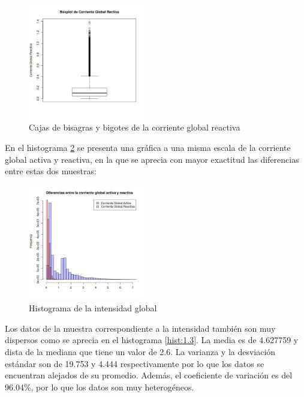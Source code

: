 \documentclass[a4paper,10pt,twocolumn]{report}
\begin{document}
	\begin{figure}[H]
	 	\centering
	 	\includegraphics[width=0.45\textwidth]{img/ex1/BoxPlots/BoxPlots_GRP.jpeg} 
	 	\caption{Cajas de bisagras y bigotes de la corriente global reactiva}
	 	\label{box:1.2}
	\end{figure}
	
	En el histograma \ref{hist:1.4} se presenta una gráfica a una misma escala de la corriente global activa y reactiva, en la que se aprecia con mayor exactitud las diferencias entre estas dos muestras:
	
	\begin{figure}[H]
		\centering
		\includegraphics[width=0.45\textwidth]{img/ex1/Powers.jpeg} 
		\caption{Histograma de la intensidad global}
		\label{hist:1.4}
	\end{figure}
	
	Los datos de la muestra correspondiente a la intensidad también son muy dispersos como se aprecia en el histograma \ref{hist:1.3}. La media es de 4.627759 y dista de la mediana que tiene un valor de 2.6. La varianza y la desviación estándar son de 19.753 y 4.444 respectivamente por lo que los datos se encuentran alejados de su promedio. Además, el coeficiente de variación es del 96.04\%, por lo que los datos son muy heterogéneos.
	
\end{document}
